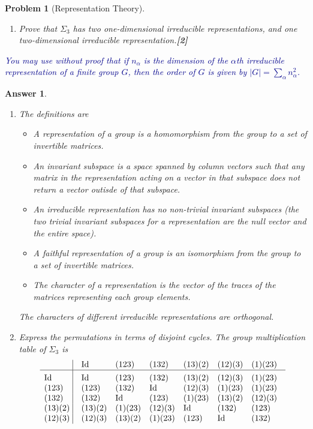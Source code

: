 \documentclass[a4paper]{article}
\DeclareMathOperator{\Id}{Id}
\newtheorem{ans}{Answer}[section]
\theoremstyle{new}
\newtheorem{qns}{Problem}[section]
\begin{document}
\begin{qns}[Representation Theory]
\begin{enumerate}[label=(\roman*)]
\item Prove that $\Sigma_3$ has two one-dimensional irreducible representations, and one two-dimensional irreducible representation.\hfill\textbf{[2]}
\end{enumerate}
\begin{mdframed}
\textcolor{darkblue}{You may use without proof that if $n_\alpha$ is the dimension of the $\alpha$th irreducible representation of a finite group $G$, then the order of $G$ is given by $|G|=\sum_\alpha n_\alpha^2$.}
\end{mdframed}
\end{qns}
\begin{ans}\leavevmode
\begin{enumerate}[label=(\roman*)]
\item The definitions are
\begin{itemize}
    \item A representation of a group is a homomorphism from the group to a set of invertible matrices.
    \item An invariant subspace is a space spanned by column vectors such that any matrix in the representation acting on a vector in that subspace does not return a vector outisde of that subspace.
    \item An irreducible representation has no non-trivial invariant subspaces (the two trivial invariant subspaces for a representation are the null vector and the entire space).
    \item A faithful representation of a group is an isomorphism from the  group to a set of invertible matrices.
    \item The character of a representation is the vector of the traces of the matrices representing each group elements.
\end{itemize}
The characters of different irreducible representations are orthogonal.
\item Express the permutations in terms of disjoint cycles. The group multiplication table of $\Sigma_3$ is
$$\vbox{\tabskip0.5em\offinterlineskip
    \halign{\strut$#$\hfil\ \tabskip1em\vrule&&$#$\hfil\cr
        & \Id   & (123) & (132) & (13)(2) & (12)(3) &(1)(23)     \cr
    \noalign{\hrule}\vrule height 12pt width 0pt
    \Id & \Id  & (123) & (132) & (13)(2) & (12)(3) &(1)(23)     \cr
    (123) & (123) & (132) & \Id &(12)(3)& (1)(23) & (1)(23) \cr
    (132) & (132) & \Id & (123) & (1)(23) & (13)(2) & (12)(3) \cr
    (13)(2) & (13)(2) & (1)(23) &(12)(3) & \Id &(132) & (123) \cr
    (12)(3) & (12)(3)& (13)(2)&(1)(23) &(123) &\Id & (132) \cr
}}$$
\end{enumerate}
\end{ans}
\end{document}

